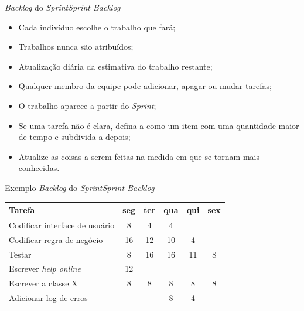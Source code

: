 \begin{frame}{{\em Backlog} do \em{Sprint}}{{\em Sprint Backlog}}
\begin{itemize}[<+-| alert@+>]
\item Cada indivíduo escolhe o trabalho que fará;
\item Trabalhos nunca são atribuídos;
\item Atualização diária da estimativa do trabalho restante;
\item Qualquer membro da equipe pode adicionar, apagar ou mudar tarefas;
\item O trabalho aparece a partir do {\em Sprint};
\item Se uma tarefa não é clara, defina-a como um item com uma quantidade maior de tempo e subdivida-a depois;
\item Atualize as coisas a serem feitas na medida em que se tornam mais conhecidas.
\end{itemize}
\end{frame}

\begin{frame}{Exemplo {\em Backlog} do \em{Sprint}}{{\em Sprint Backlog}}

\begin{center}
\begin{tabular}{|l|c|c|c|c|c|}\hline
\bf\hfil Tarefa& \bf seg &\bf  ter & \bf qua &\bf  qui &\bf  sex \\\hline
Codificar interface de usuário & 8 & 4 & 4 & & \\\hline
Codificar regra de negócio  & 16 & 12 & 10 & 4& \\\hline
Testar  & 8 & 16 & 16 & 11 & 8 \\\hline
Escrever {\em help online}  & 12 &  &  & & \\\hline
Escrever a classe X  & 8 & 8 & 8 & 8& 8\\\hline
Adicionar log de erros  &  &  & 8 & 4 & \\\hline
\end{tabular}
\end{center}
\end{frame}



